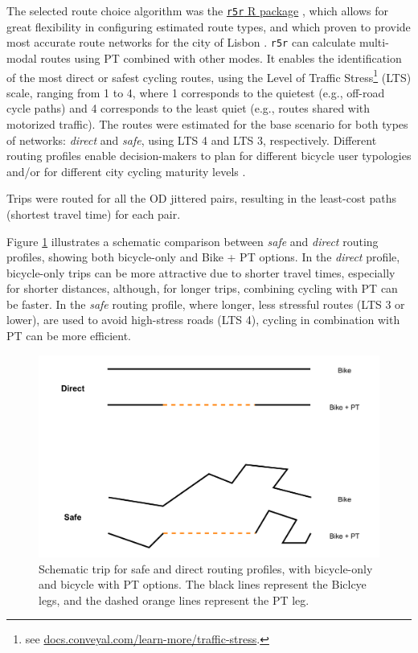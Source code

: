 \documentclass[review, doubleblind, 3p,
authoryear]{elsarticle} %
\begin{document}
The selected route choice algorithm was the
\href{https://ipeagit.github.io/r5r/}{\texttt{r5r} R package}
\citep{r5r}, which allows for great flexibility in configuring estimated
route types, and which proven to provide most accurate route networks
for the city of Lisbon \citep{Lovelace2022exploring}. \texttt{r5r} can
calculate multi-modal routes using PT combined with other modes. It
enables the identification of the most direct or safest cycling routes,
using the Level of Traffic Stress\footnote{see
  \href{https://docs.conveyal.com/learn-more/traffic-stress}{docs.conveyal.com/learn-more/traffic-stress}.}
(LTS) scale, ranging from 1 to 4, where 1 corresponds to the quietest
(e.g., off-road cycle paths) and 4 corresponds to the least quiet (e.g.,
routes shared with motorized traffic). The routes were estimated for the
base scenario for both types of networks: \emph{direct} and \emph{safe},
using LTS 4 and LTS 3, respectively. Different routing profiles enable
decision-makers to plan for different bicycle user typologies and/or for
different city cycling maturity levels \citep{felix2017}.

Trips were routed for all the OD jittered pairs, resulting in the
least-cost paths (shortest travel time) for each pair.

Figure \ref{fig:trip_schematic} illustrates a schematic comparison
between \emph{safe} and \emph{direct} routing profiles, showing both
bicycle-only and Bike + PT options. In the \emph{direct} profile,
bicycle-only trips can be more attractive due to shorter travel times,
especially for shorter distances, although, for longer trips, combining
cycling with PT can be faster. In the \emph{safe} routing profile, where
longer, less stressful routes (LTS 3 or lower), are used to avoid
high-stress roads (LTS 4), cycling in combination with PT can be more
efficient.

\begin{figure}

{\centering \includegraphics[width=0.7\linewidth,]{img/schematic_trips_cairo} 

}

\caption{Schematic trip for safe and direct routing profiles, with bicycle-only and bicycle with PT options. The black lines represent the Biclcye legs, and the dashed orange lines represent the PT leg.}\label{fig:trip_schematic}
\end{figure}
\end{document}

